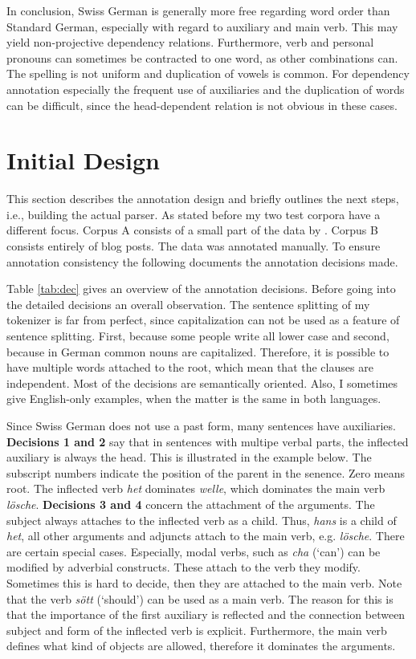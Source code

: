 \documentclass[11pt,letterpaper, covington]{article}
\begin{document}
In conclusion, Swiss German is generally more free regarding word order than Standard German, especially with regard to auxiliary and main verb. This may yield non-projective dependency relations. Furthermore, verb and personal pronouns can sometimes be contracted to one word, as other combinations can. The spelling is not uniform and duplication of vowels is common. For dependency annotation especially the frequent use of auxiliaries and the duplication of words can be difficult, since the head-dependent relation is not obvious in these cases.


\section{Initial Design}

This section describes the annotation design and briefly outlines the next steps, i.e., building the actual parser. As stated before my two test corpora have a different focus. Corpus A consists of a small part of the data by \citet{AH12}. Corpus B consists entirely of blog posts. The data was annotated manually. To ensure annotation consistency the following documents the annotation decisions made.

Table \ref{tab:dec} gives an overview of the annotation decisions. Before going into the detailed decisions an overall observation. The sentence splitting of my tokenizer is far from perfect, since capitalization can not be used as a feature of sentence splitting. First, because some people write all lower case and second, because in German common nouns are capitalized. Therefore, it is possible to have multiple words attached to the root, which mean that the clauses are independent. Most of the decisions are semantically oriented. Also, I sometimes give English-only examples, when the matter is the same in both languages.

Since Swiss German does not use a past form, many sentences have auxiliaries. \textbf{Decisions 1 and 2} say that in sentences with multipe verbal parts, the inflected auxiliary is always the head. This is illustrated in the example below. The subscript numbers indicate the position of the parent in the senence. Zero means root. The inflected verb \emph{het} dominates \emph{welle}, which dominates the main verb \emph{lösche}. \textbf{Decisions 3 and 4} concern the attachment of the arguments. The subject always attaches to the inflected verb as a child. Thus, \emph{hans} is a child of \emph{het}, all other arguments and adjuncts attach to the main verb, e.g. \emph{lösche}. There are certain special cases. Especially, modal verbs, such as \emph{cha} (`can') can be modified by adverbial constructs. These attach to the verb they modify. Sometimes this is hard to decide, then they are attached to the main verb.  Note that the verb \emph{sött} (`should') can be used as a main verb. The reason for this is that the importance of the first auxiliary is reflected and the connection between subject and form of the inflected verb is explicit. Furthermore, the main verb defines what kind of objects are allowed, therefore  it dominates the arguments.
\end{document}
